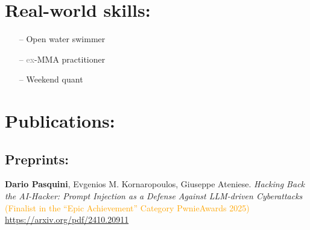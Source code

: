 \documentclass[margin, 10pt]{article} %
\begin{document}



\section*{Real-world skills:}  
\begin{itemize}
	\itemsep0em 
	\item[--] Open water swimmer 
	\item[--]  \textcolor{gray}{ex}-MMA practitioner
\ifita
\else
	\item[--]  Weekend quant
\fi
\end{itemize}

\noindent\makebox[\linewidth]{\rule{.2\paperwidth}{0.3pt}}

\noindent\section*{Publications:}

\subsection*{Preprints:}
\vspace{.5cm}
\let\oldsection\section
\renewcommand{\section}[2]{}
\begin{thebibliography}{99}
\setcounter{enumiv}{7} 
	
	
	\textbf{Dario Pasquini},  Evgenios M. Kornaropoulos, Giuseppe Ateniese. \textit{Hacking Back the AI-Hacker: Prompt Injection as a Defense Against LLM-driven Cyberattacks}  \textcolor{orange}{(Finalist in the ``Epic Achievement'' Category PwnieAwards 2025)}  \url{https://arxiv.org/pdf/2410.20911}
	
	

 \end{thebibliography}
\end{document}
